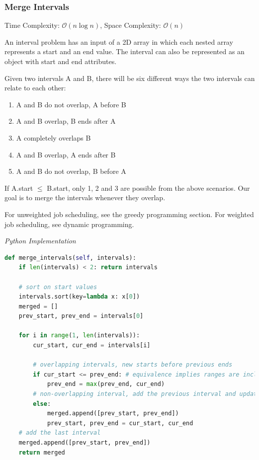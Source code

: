 \documentclass{article}
\newcommand{\bigO}{\mathcal{O}}
\begin{document}
    \subsubsection{Merge Intervals}
    Time Complexity: $\bigO(n \log n)$, Space Complexity: $\bigO(n)$
    
    An interval problem has an input of a 2D array in which each nested array represents a start and an end value. The interval can also be represented as an object with start and end attributes.
    
    Given two intervals A and B, there will be six different ways the two intervals can relate to each other:
    \begin{enumerate}
        \item A and B do not overlap, A before B
        \item A and B overlap, B ends after A
        \item A completely overlaps B
        \item A and B overlap, A ends after B
        \item  A and B do not overlap, B before A
    \end{enumerate}
    If A.start $\leq$ B.start, only 1, 2 and 3 are possible from the above scenarios.  Our goal is to merge the intervals whenever they overlap. 
    
    For unweighted job scheduling, see the greedy programming section. For weighted job scheduling, see dynamic programming. 
    
\vspace{8pt} \emph{Python Implementation}
\begin{lstlisting}[language=Python]
def merge_intervals(self, intervals):
    if len(intervals) < 2: return intervals

    # sort on start values
    intervals.sort(key=lambda x: x[0])
    merged = []
    prev_start, prev_end = intervals[0]

    for i in range(1, len(intervals)):
        cur_start, cur_end = intervals[i]
        
        # overlapping intervals, new starts before previous ends
        if cur_start <= prev_end: # equivalence implies ranges are inclusive
            prev_end = max(prev_end, cur_end)
        # non-overlapping interval, add the previous interval and update
        else:  
            merged.append([prev_start, prev_end])
            prev_start, prev_end = cur_start, cur_end
    # add the last interval
    merged.append([prev_start, prev_end]) 
    return merged
\end{lstlisting}
    
\end{document}
